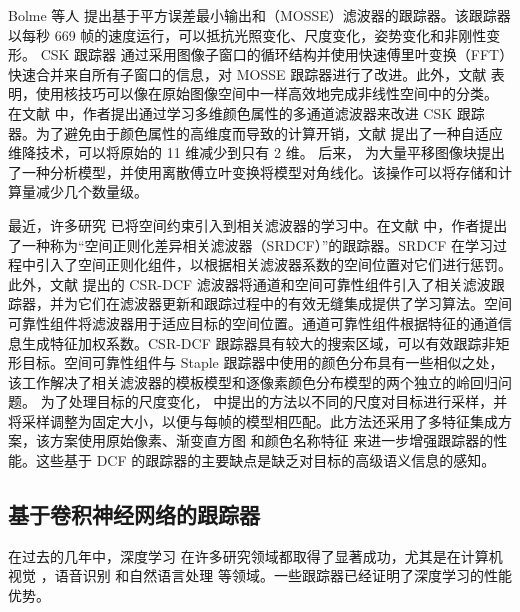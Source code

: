 Bolme 等人 \cite{2010visual} 提出基于平方误差最小输出和（MOSSE）滤波器的跟踪器。该跟踪器以每秒 669 帧的速度运行，可以抵抗光照变化、尺度变化，姿势变化和非刚性变形。
CSK 跟踪器 \cite{Henriques2012ExploitingTC} 通过采用图像子窗口的循环结构并使用快速傅里叶变换（FFT）快速合并来自所有子窗口的信息，对 MOSSE 跟踪器进行了改进。此外，文献 \cite{Henriques2012ExploitingTC} 表明，使用核技巧可以像在原始图像空间中一样高效地完成非线性空间中的分类。
在文献 \cite{Danelljan2014AdaptiveCA} 中，作者提出通过学习多维颜色属性的多通道滤波器来改进 CSK 跟踪器。为了避免由于颜色属性的高维度而导致的计算开销，文献 \cite{Danelljan2014AdaptiveCA} 提出了一种自适应维降技术，可以将原始的 11 维减少到只有 2 维。
后来，\cite{henriques2014high-speed} 为大量平移图像块提出了一种分析模型，并使用离散傅立叶变换将模型对角线化。该操作可以将存储和计算量减少几个数量级。

最近，许多研究 \cite{Danelljan2015LearningSR, Lukezic2017DiscriminativeCF} 已将空间约束引入到相关滤波器的学习中。在文献 \cite{Danelljan2015LearningSR} 中，作者提出了一种称为“空间正则化差异相关滤波器（SRDCF）”的跟踪器。SRDCF 在学习过程中引入了空间正则化组件，以根据相关滤波器系数的空间位置对它们进行惩罚。
此外，文献 \cite{Lukezic2017DiscriminativeCF} 提出的 CSR-DCF 滤波器将通道和空间可靠性组件引入了相关滤波跟踪器，并为它们在滤波器更新和跟踪过程中的有效无缝集成提供了学习算法。空间可靠性组件将滤波器用于适应目标的空间位置。通道可靠性组件根据特征的通道信息生成特征加权系数。CSR-DCF 跟踪器具有较大的搜索区域，可以有效跟踪非矩形目标。空间可靠性组件与 Staple \cite{Bertinetto2016StapleC} 跟踪器中使用的颜色分布具有一些相似之处，该工作解决了相关滤波器的模板模型和逐像素颜色分布模型的两个独立的岭回归问题。
为了处理目标的尺度变化， \cite{Li2014ASA} 中提出的方法以不同的尺度对目标进行采样，并将采样调整为固定大小，以便与每帧的模型相匹配。此方法还采用了多特征集成方案，该方案使用原始像素、渐变直方图 \cite{Forsyth2014ObjectDW} 和颜色名称特征 \cite{Weijer2009LearningCN} 来进一步增强跟踪器的性能。这些基于 DCF 的跟踪器的主要缺点是缺乏对目标的高级语义信息的感知。

\subsection{基于卷积神经网络的跟踪器}
在过去的几年中，深度学习 \cite{Goodfellow2015DeepL} 在许多研究领域都取得了显著成功，尤其是在计算机视觉 \cite{Matiz2019InductiveCP, Zhu2019RotatedCR, Xiao2019DenseSE}，语音识别 \cite{Kim2016JointCB, Liu2019AttentionGD}和自然语言处理 \cite{Vinyals2014GrammarAA, Yousfi2017ContributionOR} 等领域。一些跟踪器已经证明了深度学习的性能优势。

